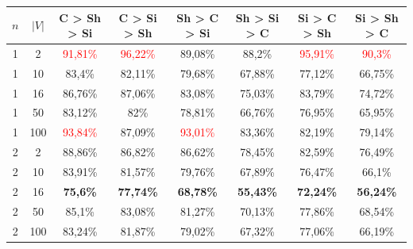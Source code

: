 \begin{table}[ht]
    \centering
    \begin{tabular}{cc|c|c|c|c|c|c}
        \toprule
        $n$ & $|V|$ & \textbf{C > Sh > Si}     & \textbf{C > Si > Sh}     & \textbf{Sh > C > Si}     & \textbf{Sh > Si > C}     & \textbf{Si > C > Sh}     & \textbf{Si > Sh > C}     \\\midrule
        {1} & {2}   & \textcolor{red}{91,81\%} & \textcolor{red}{96,22\%} & {89,08\%}                & {88,2\%}                 & \textcolor{red}{95,91\%} & \textcolor{red}{90,3\%}  \\
        {1} & {10}  & {83,4\%}                 & {82,11\%}                & {79,68\%}                & {67,88\%}                & {77,12\%}                & {66,75\%}                \\
        {1} & {16}  & {86,76\%}                & {87,06\%}                & {83,08\%}                & {75,03\%}                & {83,79\%}                & {74,72\%}                \\
        {1} & {50}  & {83,12\%}                & {82\%}                   & {78,81\%}                & {66,76\%}                & {76,95\%}                & {65,95\%}                \\
        {1} & {100} & \textcolor{red}{93,84\%} & {87,09\%}                & \textcolor{red}{93,01\%} & {83,36\%}                & {82,19\%}                & {79,14\%}                \\
        {2} & {2}   & {88,86\%}                & {86,82\%}                & {86,62\%}                & {78,45\%}                & {82,59\%}                & {76,49\%}                \\
        {2} & {10}  & {83,91\%}                & {81,57\%}                & {79,76\%}                & {67,89\%}                & {76,47\%}                & {66,1\%}                 \\
        {2} & {16}  & \textbf{75,6\%}          & \textbf{77,74\%}         & \textbf{68,78\%}         & \textbf{55,43\%}         & \textbf{72,24\%}         & \textbf{56,24\%}         \\
        {2} & {50}  & {85,1\%}                 & {83,08\%}                & {81,27\%}                & {70,13\%}                & {77,86\%}                & {68,54\%}                \\
        {2} & {100} & {83,24\%}                & {81,87\%}                & {79,02\%}                & {67,32\%}                & {77,06\%}                & {66,19\%}                \\

\end{tabular}
\end{table}
